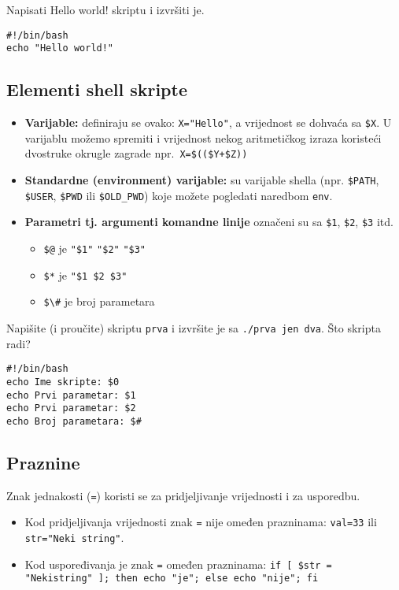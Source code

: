 \begin{zadatak}Napisati Hello world! skriptu i izvršiti je.
\begin{lstlisting}
#!/bin/bash 
echo "Hello world!"
\end{lstlisting}
\end{zadatak}
\subsection*{Elementi shell skripte}
\begin{itemize}
 \item \textbf{Varijable: } definiraju se ovako: \lstinline!X="Hello"!, a vrijednost se dohvaća sa \lstinline!$X!. U varijablu možemo spremiti i vrijednost nekog aritmetičkog izraza koristeći dvostruke okrugle zagrade npr.~\lstinline!X=$(($Y+$Z))!
\item \textbf{Standardne (environment) varijable: } su varijable shella (npr. \lstinline!$PATH!, \lstinline!$USER!, \lstinline!$PWD! ili \lstinline!$OLD_PWD!) koje možete pogledati naredbom \texttt{env}.
\item \textbf{Parametri tj. argumenti komandne linije} označeni su sa \lstinline!$1!, \lstinline!$2!, \lstinline!$3! itd.
\begin{itemize}
 \item \lstinline!$@! je \lstinline!"$1"! \lstinline!"$2"! \lstinline!"$3"!
\item \lstinline!$*! je \lstinline!"$1 $2 $3"!
\item \lstinline!$\#! je broj parametara
\end{itemize}

\end{itemize}

\begin{zadatak}
Napišite (i proučite) skriptu \texttt{prva} i izvršite je sa \texttt{./prva jen dva}. Što skripta radi?
\begin{lstlisting}
#!/bin/bash
echo Ime skripte: $0
echo Prvi parametar: $1
echo Prvi parametar: $2
echo Broj parametara: $#
\end{lstlisting}
\end{zadatak}
\subsection*{Praznine}
Znak jednakosti (\lstinline!=!) koristi se za pridjeljivanje vrijednosti i za usporedbu.
\begin{itemize}
\item 
Kod pridjeljivanja vrijednosti znak \lstinline!=! nije omeđen prazninama: \lstinline!val=33! ili \lstinline!str="Neki string"!.
\item Kod uspoređivanja je znak \lstinline!=! omeđen prazninama: \lstinline!if [ $str = "Nekistring" ]; then echo "je"; else echo "nije"; fi!
\end{itemize}

